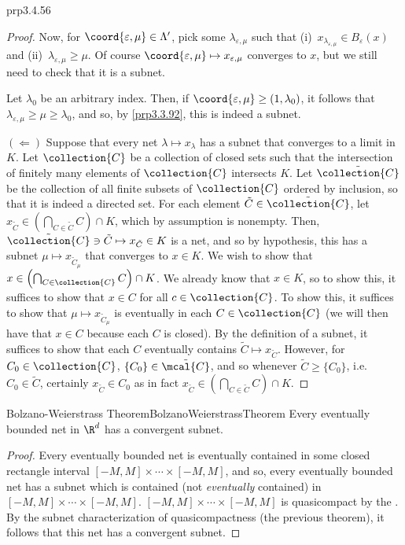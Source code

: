 \begin{thm}{}{prp3.4.56}
\begin{proof}
Now, for $\coord{\varepsilon ,\mu}\in \Lambda '$, pick some $\lambda _{\varepsilon ,\mu}$ such that (i)~$x_{\lambda _{\varepsilon ,\mu}}\in B_\varepsilon (x)$ and (ii)~$\lambda _{\varepsilon ,\mu}\geq \mu$.  Of course $\coord{\varepsilon ,\mu}\mapsto x_{\varepsilon ,\mu}$ converges to $x$, but we still need to check that it is a subnet.

Let $\lambda _0$ be an arbitrary index.  Then, if $\coord{\varepsilon ,\mu}\geq (1,\lambda _0)$, it follows that $\lambda _{\varepsilon ,\mu}\geq \mu \geq \lambda _0$, and so, by \cref{prp3.3.92}, this is indeed a subnet.

\blankline
\noindent
$(\Leftarrow )$ Suppose that every net $\lambda \mapsto x_\lambda$ has a subnet that converges to a limit in $K$.  Let $\collection{C}$ be a collection of closed sets such that the intersection of finitely many elements of $\collection{C}$ intersects $K$.  Let $\tilde{\collection{C}}$ be the collection of all finite subsets of $\collection{C}$ ordered by inclusion, so that it is indeed a directed set.  For each element $\tilde{C}\in \tilde{\collection{C}}$, let $x_{\tilde{C}}\in \left( \bigcap _{C\in \tilde{C}}C\right) \cap K$, which by assumption is nonempty.  Then, $\tilde{\collection{C}}\ni \tilde{C}\mapsto x_{\tilde{C}}\in K$ is a net, and so by hypothesis, this has a subnet $\mu \mapsto x_{\tilde{C}_\mu}$ that converges to $x\in K$.  We wish to show that $x\in \left( \bigcap _{C\in \collection{C}}C\right) \cap K$.  We already know that $x\in K$, so to show this, it suffices to show that $x\in C$ for all $c\in \collection{C}$.  To show this, it suffices to show that $\mu \mapsto x_{\tilde{C}_\mu}$ is eventually in each $C\in \collection{C}$ (we will then have that $x\in C$ because each $C$ is closed).  By the definition of a subnet, it suffices to show that each $C$ eventually contains $\tilde{C}\mapsto x_{\tilde{C}}$.  However, for $C_0\in \collection{C}$, $\{ C_0\} \in \tilde{\mcal{C}}$, and so whenever $\tilde{C}\geq \{ C_0\}$, i.e.~$C_0\in \tilde{C}$, certainly $x_{\tilde{C}}\in C_0$ as in fact $x_{\tilde{C}}\in \left( \bigcap _{C\in \tilde{C}}C\right) \cap K$.
\end{proof}
\end{thm}
\begin{crl}{Bolzano-Weierstrass Theorem}{BolzanoWeierstrassTheorem}
Every eventually bounded net in $\R ^d$ has a convergent subnet.
\begin{proof}
Every eventually bounded net is eventually contained in some closed rectangle interval $[-M,M]\times \cdots \times [-M,M]$, and so, every eventually bounded net has a subnet which is contained (not \emph{eventually} contained) in $[-M,M]\times \cdots \times [-M,M]$.  $[-M,M]\times \cdots \times [-M,M]$ is quasicompact by the .  By the subnet characterization of quasicompactness (the previous theorem), it follows that this net has a convergent subnet.
\end{proof}
\end{crl}
